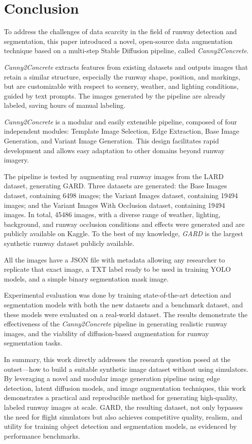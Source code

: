 \chapter{Conclusion}

To address the challenges of data scarcity in the field of runway detection and segmentation,
this paper introduced a novel, open-source data augmentation technique based on a multi-step
Stable Diffusion pipeline, called \emph{Canny2Concrete}.

\emph{Canny2Concrete} extracts features from existing datasets and outputs images
that retain a similar structure, especially the runway shape, position, and markings, but are
customizable with respect to scenery, weather, and lighting conditions, guided by
text prompts. The images generated by the pipeline are already
labeled, saving hours of manual labeling.

\emph{Canny2Concrete} is a modular and easily extensible pipeline, composed of four
independent modules: Template Image Selection, Edge Extraction, Base Image Generation,
and Variant Image Generation. This design facilitates rapid development and
allows easy adaptation to other domains beyond runway imagery.

The pipeline is tested by augmenting real runway images from the LARD \cite{ducoffe_lard_2023}
dataset, generating \ac{GARD}. Three datasets are generated: the Base Images dataset,
containing 6498 images; the Variant Images dataset, containing 19494 images; and
the Variant Images With Occlusion dataset, containing 19494 images. In total,
45486 images, with a diverse range of weather, lighting, background, and runway
occlusion conditions and effects were generated and are publicly available on Kaggle.
To the best of my knowledge, \emph{GARD} is the largest synthetic runway
dataset publicly available.

All the images have a JSON file
with metadata allowing any researcher to replicate that exact image, a TXT label
ready to be used in training YOLO models, and a simple binary segmentation mask
image. 

Experimental evaluation was done by training state-of-the-art detection and
segmentation models with both the new datasets and a benchmark dataset, and
these models were evaluated on a real-world dataset. The results demonstrate
the effectiveness of the \emph{Canny2Concrete} pipeline in generating realistic runway
images, and the viability of diffusion-based augmentation for runway segmentation
tasks.

In summary, this work directly addresses the research question posed at the
outset—how to build a suitable synthetic image dataset without using simulators.
By leveraging a novel and modular image generation pipeline using edge
detection, latent diffusion models, and image augmentation techniques, this work
demonstrates a practical and reproducible method for generating high-quality,
labeled runway images at scale. \ac{GARD}, the resulting dataset, not only bypasses the need
for flight simulators but also achieves competitive quality, realism, and utility for
training object detection and segmentation models, as evidenced by performance
benchmarks.

